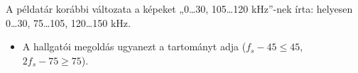 \begin{figyelem}[Javítás]
A példatár korábbi változata a képeket „0\ldots{}30, 105\ldots{}120 kHz”-nek írta: helyesen 0\ldots{}30, 75\ldots{}105, 120\ldots{}150 kHz.
\end{figyelem}
\begin{eredmeny}

\begin{center}\end{center}
\end{eredmeny}
\begin{tipp}[Ellenőrzés]
\begin{itemize}
\item A hallgatói megoldás ugyanezt a tartományt adja ($f_s-45\le45$, $2f_s-75\ge75$).
\end{itemize}
\end{tipp}


